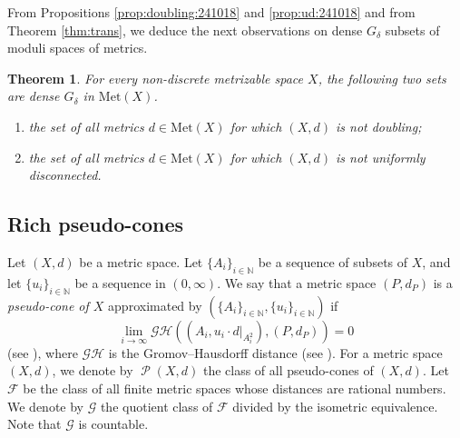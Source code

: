 \documentclass[a4paper, 12pt]{amsart}
\theoremstyle{plain}
\newtheorem{thm}{Theorem}[section]
\theoremstyle{definition}
\theoremstyle{remark}
\newcommand{\nn}{\mathbb{N}}
\DeclareMathOperator{\pc}{\mathscr{P}}
\newcommand{\met}[1]{\mathrm{Met}(#1)}
\begin{document}
From 
Propositions 
\ref{prop:doubling:241018}
and 
\ref{prop:ud:241018} and from 
Theorem
 \ref{thm:trans},  
we deduce the next observations on 
dense 
$G_{\delta}$
subsets of moduli spaces of metrics. 
\begin{thm}\label{thm:dandud:241018}
For every
non-discrete 
 metrizable space 
$X$,  
the following two sets are 
dense $G_{\delta}$ in 
$\met{X}$. 
\begin{enumerate}
\item 
the set of all metrics 
$d\in \met{X}$ 
for which 
$(X, d)$ is not doubling; 
\item
the set of all metrics 
$d\in \met{X}$ 
for which 
$(X, d)$ is not 
uniformly disconnected. 
\end{enumerate}
\end{thm}

\subsection{Rich pseudo-cones}
Let 
$(X, d)$
 be a metric space. 
Let 
$\{A_{i}\}_{i\in \nn}$ 
be a sequence of subsets of 
$X$,  
and let  
$\{u_{i}\}_{i\in \nn}$ 
be a sequence in 
$(0, \infty)$. 
We say that a metric space 
$(P, d_{P})$ 
is a 
\emph{pseudo-cone of $X$} 
approximated by 
$(\{A_{i}\}_{i\in \nn}, \{u_{i}\}_{i\in \nn})$ 
if 
\[
	\lim_{i\to \infty}\mathcal{GH}((A_{i}, u_{i}\cdot d|_{A_{i}^2}), (P, d_{P}))=0
\]
(see \cite{MR4173165}), 
where 
$\mathcal{GH}$ 
is the Gromov--Hausdorff distance (see \cite{MR1835418}). 
For  a metric space 
$(X, d)$,
 we denote by 
 $\pc(X, d)$ 
 the class of all pseudo-cones of 
 $(X, d)$.
Let 
$\mathscr{F}$ 
be the class of 
all finite metric spaces whose  distances 
are rational numbers. 
We denote by 
$\mathscr{G}$ 
the quotient class of 
$\mathscr{F}$ 
divided by the isometric equivalence. 
Note that 
$\mathscr{G}$ is countable.
\end{document}
